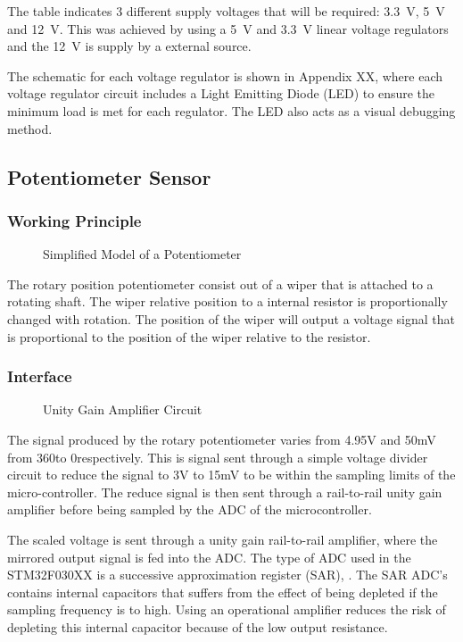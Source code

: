 The table indicates 3 different supply voltages that will be required: \SI{3.3}{V}, \SI{5}{V} and \SI{12}{V}. This was achieved by using a \SI{5}{V} and \SI{3.3}{V} linear voltage regulators and the \SI{12}{V} is supply by a external source.

The schematic for each voltage regulator is shown in Appendix XX, where each voltage regulator circuit includes a Light Emitting Diode (LED) to ensure the minimum load is met for each regulator. The LED also acts as a visual debugging method.

\subsection{Potentiometer Sensor}
\subsubsection{Working Principle}
\begin{figure}[h]
	\centering
	
	\caption{Simplified Model of a Potentiometer}
	\label{fig:potentiometer}
\end{figure}
The rotary position potentiometer consist out of a wiper that is attached to a rotating shaft. The wiper relative position to a internal resistor is proportionally changed with rotation. The position of the wiper will output a voltage signal that is proportional to the position of the wiper relative to the resistor. 

\subsubsection{Interface}
\begin{figure}[h]
	\centering
	
	\caption{Unity Gain Amplifier Circuit}
	\label{fig:unitygain}
\end{figure}
The signal produced by the rotary potentiometer varies from 4.95V and 50mV from 360\textdegree to 0\textdegree respectively. This is signal sent through a simple voltage divider circuit to reduce the signal to 3V to 15mV to be within the sampling limits of the micro-controller. The reduce signal is then sent through a rail-to-rail unity gain amplifier before being sampled by the ADC of the microcontroller.

The scaled voltage is sent through a unity gain rail-to-rail amplifier, where the mirrored output signal is fed into the ADC. The type of ADC used in the STM32F030XX is a successive approximation register (SAR), \citep{stm32_ADC:2017}. The SAR ADC's contains internal capacitors that suffers from the effect of being depleted if the sampling frequency is to high. Using an operational amplifier reduces the risk of depleting this internal capacitor because of the low output resistance.

